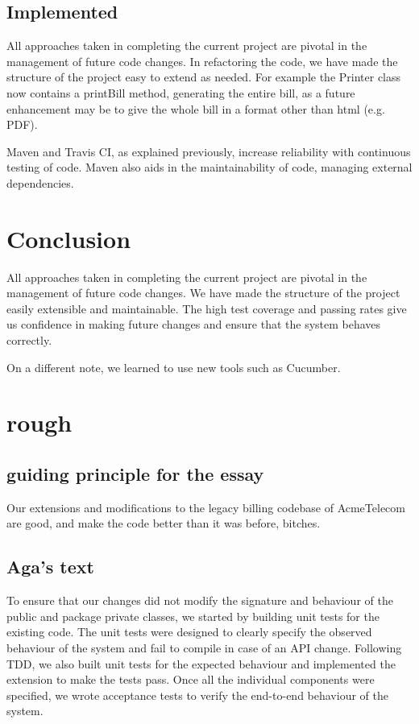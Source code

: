 \documentclass[a4paper]{article}
\begin{document}
\subsection{Implemented}

All approaches taken in completing the current project are pivotal in the management
of future code changes. In refactoring the code, we have made the structure of
the project easy to extend as needed. For example the Printer class now contains
a printBill method, generating the entire bill, as a future enhancement may be to
give the whole bill in a format other than html (e.g. PDF).

Maven and Travis CI, as explained previously, increase reliability with continuous
testing of code. Maven also aids in the maintainability of code, managing external
dependencies.

\section{Conclusion}

All approaches taken in completing the current project are pivotal in the management of future code changes. We have made the structure of the project easily extensible and maintainable. The high test coverage and passing rates give us confidence in making future changes and ensure that the system behaves correctly. 

On a different note, we learned to use new tools such as Cucumber.


\section{rough}

\subsection{guiding principle for the essay}

Our extensions and modifications to the legacy billing codebase of AcmeTelecom are good, and make the code better than it was before, bitches.

\subsection{Aga's text}

To ensure that our changes did not modify the signature and behaviour of the public and package private classes, we started by building unit tests for the existing code. The unit tests were designed to clearly specify the observed behaviour of the system and fail to compile in case of an API change. Following TDD, we also built unit tests for the expected behaviour and implemented the extension to make the tests pass. Once all the individual components were specified, we wrote acceptance tests to verify the end-to-end behaviour of the system.
\end{document}
